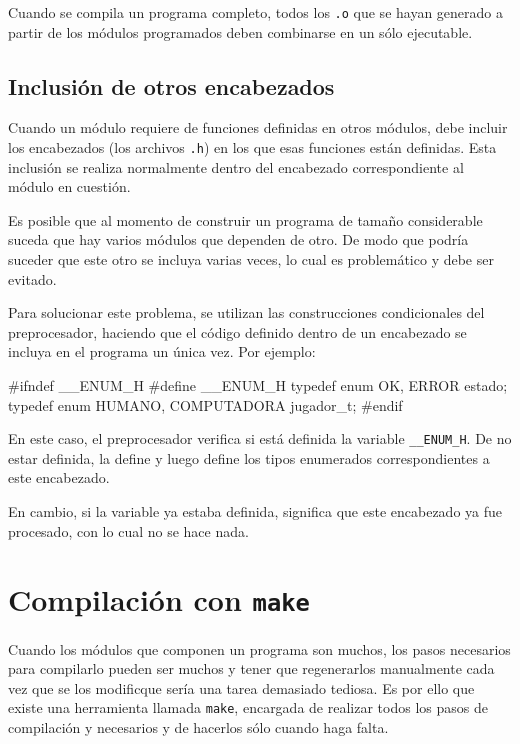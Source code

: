 Cuando se compila un programa completo, todos los \verb!.o! que se hayan
generado a partir de los módulos programados deben combinarse en un sólo
ejecutable.

\subsection{Inclusión de otros encabezados}

Cuando un módulo requiere de funciones definidas en otros módulos, debe
incluir los encabezados (los archivos \verb!.h!) en los que esas funciones
están definidas.  Esta inclusión se realiza normalmente dentro del encabezado
correspondiente al módulo en cuestión.

Es posible que al momento de construir un programa de tamaño considerable
suceda que hay varios módulos que dependen de otro. De modo que podría suceder
que este otro se incluya varias veces, lo cual es problemático y debe ser
evitado.

Para solucionar este problema, se utilizan las construcciones condicionales
del preprocesador, haciendo que el código definido dentro de un encabezado se
incluya en el programa un única vez. Por ejemplo:

\begin{codigo-c-plano}
#ifndef __ENUM_H
    #define __ENUM_H
    typedef enum {OK, ERROR} estado;
    typedef enum {HUMANO, COMPUTADORA} jugador_t;
#endif
\end{codigo-c-plano}

En este caso, el preprocesador verifica si está definida la variable
\lstinline!__ENUM_H!. De no estar definida, la define y luego define los tipos
enumerados correspondientes a este encabezado.

En cambio, si la variable ya estaba definida, significa que este encabezado ya
fue procesado, con lo cual no se hace nada.


\section{Compilación con \texttt{make}}

Cuando los módulos que componen un programa son muchos, los pasos necesarios
para compilarlo pueden ser muchos y tener que regenerarlos manualmente cada
vez que se los modificque sería una tarea demasiado tediosa.  Es por ello que
existe una herramienta llamada \verb!make!, encargada de realizar todos los
pasos de compilación y necesarios y de hacerlos sólo cuando haga falta.

